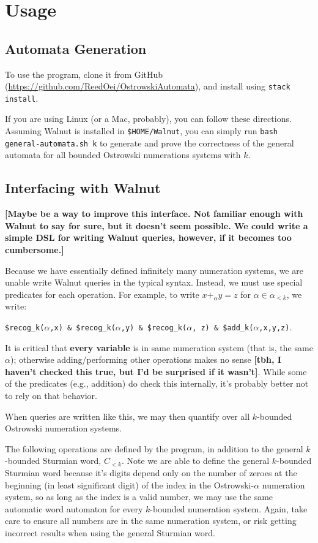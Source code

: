 \documentclass{article}
\theoremstyle{definition}
\theoremstyle{remark}
\theoremstyle{remark}
\theoremstyle{plain}
\theoremstyle{definition}
\newcommand{\reed}[1]{{\color{magenta}\bfseries [#1]}}
\begin{document}
\section{Usage}\label{sec:usage}
\subsection{Automata Generation}
To use the program, clone it from GitHub (\url{https://github.com/ReedOei/OstrowskiAutomata}), and install using \texttt{stack install}.

If you are using Linux (or a Mac, probably), you can follow these directions.
Assuming Walnut is installed in \texttt{\$HOME/Walnut}, you can simply run \texttt{bash general-automata.sh k} to generate and prove the correctness of the general automata for all bounded Ostrowski numerations systems with $k$.

\subsection{Interfacing with Walnut}
\reed{Maybe be a way to improve this interface. Not familiar enough with Walnut to say for sure, but it doesn't seem possible. We could write a simple DSL for writing Walnut queries, however, if it becomes too cumbersome.}

Because we have essentially defined infinitely many numeration systems, we are unable write Walnut queries in the typical syntax.
Instead, we must use special predicates for each operation.
For example, to write $x +_{\alpha} y = z$ for $\alpha \in \alpha_{<k}$, we write:

\texttt{\$recog\_k($\alpha$,x) \& \$recog\_k($\alpha$,y) \& \$recog\_k($\alpha$, z) \& \$add\_k($\alpha$,x,y,z)}.

It is critical that \textbf{every variable} is in same numeration system (that is, the same $\alpha$); otherwise adding/performing other operations makes no sense \reed{tbh, I haven't checked this true, but I'd be surprised if it wasn't}.
While some of the predicates (e.g., addition) do check this internally, it's probably better not to rely on that behavior.

When queries are written like this, we may then quantify over all $k$-bounded Ostrowski numeration systems.

The following operations are defined by the program, in addition to the general $k$-bounded Sturmian word, $C_{<k}$.
Note we are able to define the general $k$-bounded Sturmian word because it's digits depend only on the number of zeroes at the beginning (in least significant digit) of the index in the Ostrowski-$\alpha$ numeration system, so as long as the index is a valid number, we may use the same automatic word automaton for every $k$-bounded numeration system.
Again, take care to ensure all numbers are in the same numeration system, or risk getting incorrect results when using the general Sturmian word.
\end{document}
